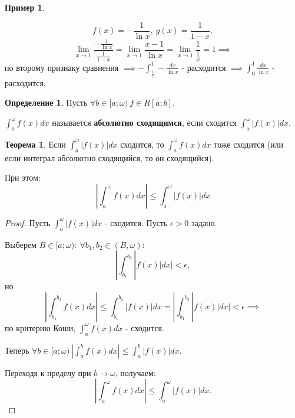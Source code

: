 \documentclass{report}
\theoremstyle{definition}
\newtheorem{definition}{Определение}[section]
\newtheorem{example}{Пример}
\newtheorem{theorem}{Теорема}[section]
\begin{document}
\begin{example}
\begin{enumerate}
          \begin{equation*}
            f(x) = -\frac{1}{\ln x}, \ g(x) = \frac{1}{1-x},
          \end{equation*}
          \begin{equation*}
            \underset{x\rightarrow1}{\lim}\frac{-\frac{1}{\ln x}}{\frac{1}{1-x}} = \underset{x\rightarrow1}
            {\lim}\frac{x-1}{\ln x} = \underset{x\rightarrow1}{\lim}\frac{1}{\frac{1}{x}} = 1 \implies
          \end{equation*}
          по второму признаку сравнения $\implies -\int_{\frac{1}{2}}^{1}-\frac{dx}{\ln x}$ - расходится
          $\implies \int_{0}^{1}\frac{dx}{\ln x}$ - расходится.
  \end{enumerate}
\end{example}

\begin{definition}
  Пусть $\forall b \in [a;\omega) \ f\in R[a;b]$.

  $\int_{a}^{\omega}f(x)dx$ называется \textbf{абсолютно сходящимся}, если сходится $\int_{a}^{\omega}|f(x)|dx$.
\end{definition}

\begin{theorem}
  Если $\int_{a}^{\omega}| f(x) |dx$ сходится, то $\int_{a}^{\omega}f(x)dx$ тоже сходится (или если интеграл
  абсолютно сходящийся, то он сходящийся).

  При этом:
  \begin{equation*}
    | \int_{a}^{\omega}f(x)dx | \leqslant \int_{a}^{\omega}| f(x) |dx
  \end{equation*}
\end{theorem}

\begin{proof}
  Пусть $\int_{a}^{\omega}| f(x) |dx$ - сходится. Пусть $\epsilon > 0$ задано.

  Выберем $B\in[a;\omega): \ \forall b_1,b_2 \in (B,\omega):$
  \begin{equation*}
    | \int_{b_1}^{b_2}| f(x) |dx | < \epsilon,
  \end{equation*}
  но
  \begin{equation*}
    | \int_{b_1}^{b_2}f(x)dx | \leqslant \int_{b_1}^{b_2}| f(x) |dx = | \int_{b_1}^{b_2}| f(x) |dx | <
    \epsilon \implies
  \end{equation*}
  по критерию Коши, $\int_{a}^{\omega}f(x)dx$ - сходится.

  Теперь $\forall b\in [a;\omega) \ | \int_{a}^{b}f(x)dx | \leqslant \int_{a}^{b}| f(x) |dx$.

  Переходя к пределу при $b\rightarrow \omega$, получаем:
  \begin{equation*}
    | \int_{a}^{\omega}f(x)dx | \leqslant \int_{a}^{\omega} | f(x) |dx.
  \end{equation*}
\end{proof}
\end{document}
